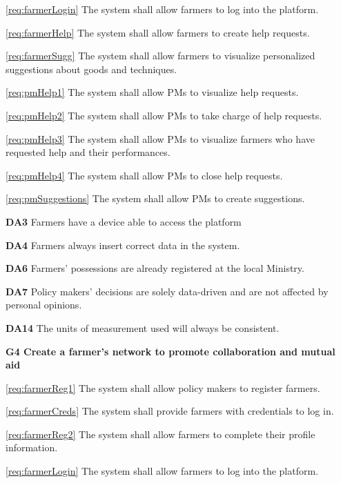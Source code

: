\documentclass[10pt]{article}
\begin{document}
\begin{description}
\begin{description}
            \item \ref{req:farmerLogin} The system shall allow farmers to log into the platform.
            \item \ref{req:farmerHelp} The system shall allow farmers to create help requests.     
            \item \ref{req:farmerSugg} The system shall allow farmers to visualize personalized suggestions about goods and techniques. 
            \item \ref{req:pmHelp1} The system shall allow PMs to visualize help requests.
            \item \ref{req:pmHelp2} The system shall allow PMs to take charge of help requests.
            \item \ref{req:pmHelp3} The system shall allow PMs to visualize farmers who have requested help and their performances.
            \item \ref{req:pmHelp4} The system shall allow PMs to close help requests.
            \item \ref{req:pmSuggestions} The system shall allow PMs to create suggestions.
            \item \textbf{DA3} Farmers have a device able to access the platform
            \item \textbf{DA4} Farmers always insert correct data in the system.
            \item \textbf{DA6} Farmers' possessions are already registered at the local Ministry.
            \item \textbf{DA7} Policy makers' decisions are solely data-driven and are not affected by personal opinions.
            \item \textbf{DA14} The units of measurement used will always be consistent. 
        \end{description}
    \item \textbf{G4 Create a farmer's network to promote collaboration and mutual aid}
        \begin{description}
            \item \ref{req:farmerReg1} The system shall allow policy makers to register farmers.    
            \item \ref{req:farmerCreds} The system shall provide farmers with credentials to log in.    
            \item \ref{req:farmerReg2} The system shall allow farmers to complete their profile information.    
            \item \ref{req:farmerLogin} The system shall allow farmers to log into the platform.

\end{description}
\end{description}
\end{document}
